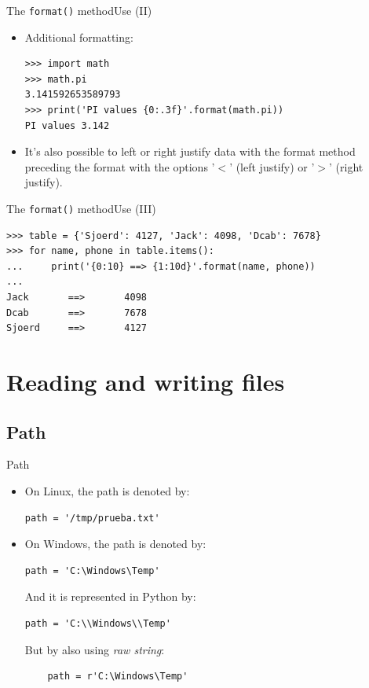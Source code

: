 \documentclass[10pt,compress]{beamer} %
\begin{document}
\begin{frame}[fragile]{The \texttt{format()} method}{Use (II)}
\begin{itemize}
\item Additional formatting:
\begin{verbatim}
>>> import math
>>> math.pi
3.141592653589793
>>> print('PI values {0:.3f}'.format(math.pi))
PI values 3.142
\end{verbatim}
\item It's also possible to left or right justify data with the format method preceding the format with the options '$<$' (left justify) or '$>$' (right justify).\\
\end{itemize}
\end{frame}

\begin{frame}[fragile]{The \texttt{format()} method}{Use (III)}
\begin{verbatim}
>>> table = {'Sjoerd': 4127, 'Jack': 4098, 'Dcab': 7678}
>>> for name, phone in table.items():
...     print('{0:10} ==> {1:10d}'.format(name, phone))
... 
Jack       ==>       4098
Dcab       ==>       7678
Sjoerd     ==>       4127
\end{verbatim}

\end{frame}

\section{Reading and writing files}

\subsection{Path}
\begin{frame}[fragile]{Path}{}
\begin{itemize}
	\item On Linux, the path is denoted by: \\
\begin{verbatim}
path = '/tmp/prueba.txt'
\end{verbatim}
	\item On Windows, the path is denoted by: \\
\begin{verbatim}
path = 'C:\Windows\Temp'
\end{verbatim}
	And it is represented  in Python by:\\
\begin{verbatim}
path = 'C:\\Windows\\Temp'
\end{verbatim}
	But by also using \textit{raw string}:
\begin{verbatim}
    path = r'C:\Windows\Temp'
\end{verbatim}
\end{itemize}
\end{frame}
\end{document}
